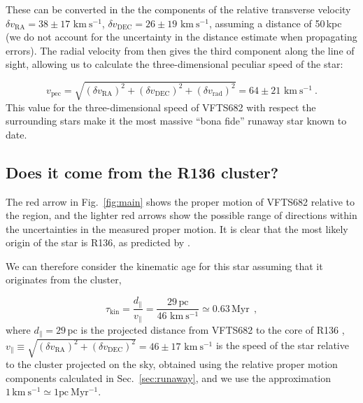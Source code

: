 \documentclass{aa}
\newcommand{\kms}{{\,\mathrm{km\ s^{-1}}}}
\DeclareRobustCommand{\Figref}[1]{Fig.~\ref{#1}}
\DeclareRobustCommand{\Secref}[1]{Sec.~\ref{#1}}
\begin{document}
These can be converted in the
the components of the relative transverse velocity $\delta v_\mathrm{RA}=38\pm17\,\kms$,
$\delta v_\mathrm{DEC}=26\pm19\,\kms$, assuming a distance of
50\,kpc (we do not account for the uncertainty in the distance
estimate when propagating errors). The radial velocity from
\cite{bestenlehner:11} then gives the third component along
the line of sight, allowing us to calculate the three-dimensional
peculiar speed of the star:

\begin{equation}
  \label{eq:speed_around}
  v_\mathrm{pec} = \sqrt{\left(\delta v_\mathrm{RA}\right)^2
    +\left(\delta v_\mathrm{DEC}\right)^2+\left(\delta
      v_\mathrm{rad}\right)^2} = 64 \pm 21 
  \, \kms \ .
\end{equation}
This value for the three-dimensional speed of VFTS682 with respect the
surrounding stars make it the most massive ``bona fide'' runaway star
known to date.

\subsection{Does it come from the R136 cluster?}
\label{sec:r136_origin}

The red arrow in \Figref{fig:main} shows the proper motion of VFTS682
relative to the region, and the lighter red arrows show the possible
range of directions within the uncertainties in the measured proper
motion. It is clear that the most likely origin of the star is R136,
as predicted by \cite{fujii:11, banerjee:12}.


We can therefore consider the kinematic age for this star assuming
that it originates from the cluster,

\begin{equation}
  \label{eq:kin_age}
  \tau_\mathrm{kin} = \frac{d_\parallel}{v_\parallel} =
  \frac{29\,\mathrm{pc}}{46\,\kms} \simeq 0.63\, \mathrm{Myr} \ \ ,
\end{equation}
where $d_\parallel =29$\,pc is the projected distance from VFTS682 to
the core of R136 \citep[][]{bestenlehner:11}, $v_\parallel \equiv \sqrt{\left(\delta v_\mathrm{RA}\right)^2
    +\left(\delta v_\mathrm{DEC}\right)^2} =46\pm
17\,\kms$ is the speed of the star relative to the cluster projected on the sky, obtained
using the relative proper motion components calculated in
\Secref{sec:runaway}, and we use the approximation $1 \kms \simeq 1
\mathrm{pc \ Myr^{-1}}$.
\end{document}
